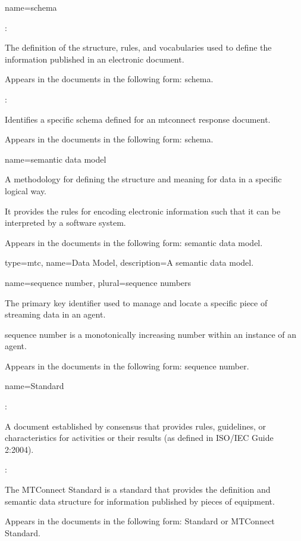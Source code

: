{
  name={schema}
}
{
	:

	The definition of the structure, rules, and vocabularies used to define the information published in an electronic document.

	Appears in the documents in the following form: schema.

	:

	Identifies a specific schema defined for an \gls{mtconnect response document}.

	Appears in the documents in the following form: \gls{schema}.
}


{
  name={semantic data model}
}
{
	A methodology for defining the structure and meaning for data in a specific logical way.  

	It provides the rules for encoding electronic information such that it can be interpreted by a software system.  

	Appears in the documents in the following form: \gls{semantic data model}.
}

{
  type=mtc,
  name={Data Model},
  description={A \gls{semantic data model}.}
}

{
  name={sequence number},
  plural={sequence numbers}
}
{
	The primary key identifier used to manage and locate a specific piece of \gls{streaming data} in an \gls{agent}.

	\gls{sequence number} is a monotonically increasing number within an instance of an \gls{agent}.

	Appears in the documents in the following form: \gls{sequence number}.
}


{
  name={Standard}
}
{
	:

	A document established by consensus that provides rules, guidelines, or characteristics for activities or their results (as defined in ISO/IEC Guide 2:2004).

	: 

	The MTConnect Standard is a standard that provides the definition and semantic data structure for information published by pieces of equipment.

	Appears in the documents in the following form: Standard or MTConnect Standard.
}


